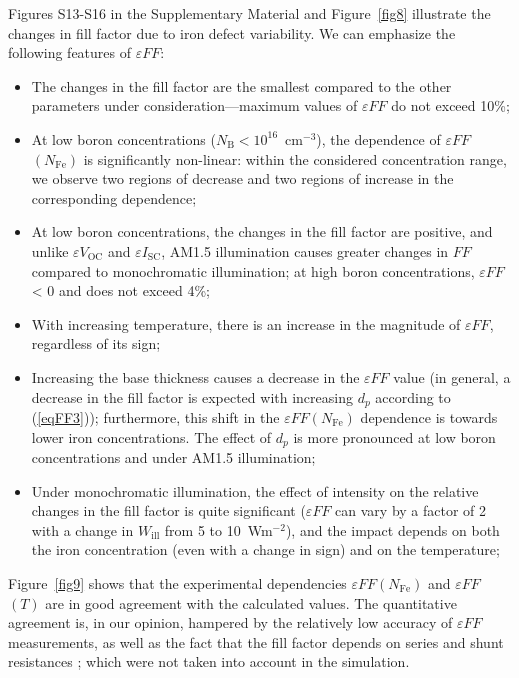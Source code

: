 \documentclass[a4paper,fleqn]{cas-sc}
\begin{document}
Figures S13-S16 in the Supplementary Material and Figure~\ref{fig8} illustrate the changes in fill factor due to iron defect variability. We can emphasize the following features of $\varepsilon FF$:
\begin{itemize}
    \item The changes in the fill factor are the smallest compared to the other parameters under consideration—maximum values of $\varepsilon FF$ do not exceed 10\%;
    \item At low boron concentrations ($N_\mathrm{B}<10^{16}$~cm$^{-3}$), the dependence of $\varepsilon FF$$\left(N_\mathrm{Fe}\right)$ is significantly non-linear: within the considered concentration range, we observe two regions of decrease and two regions of increase in the corresponding dependence;
    \item At low boron concentrations, the changes in the fill factor are positive, and unlike $\varepsilon V_\mathrm{OC}$ and $\varepsilon I_\mathrm{SC}$, AM1.5 illumination causes greater changes in $FF$ compared to monochromatic illumination; at high boron concentrations, $\varepsilon FF$ < 0 and does not exceed 4\%;
    \item With increasing temperature, there is an increase in the magnitude of $\varepsilon FF$, regardless of its sign;
    \item Increasing the base thickness causes a decrease in the $\varepsilon FF$ value (in general, a decrease in the fill factor is expected with increasing $d_p$ according to (\ref{eqFF3})); furthermore, this shift in the $\varepsilon FF$$\left(N_\mathrm{Fe}\right)$ dependence is towards lower iron concentrations. The effect of $d_p$ is more pronounced at low boron concentrations and under AM1.5 illumination;
    \item Under monochromatic illumination, the effect of intensity on the relative changes in the fill factor is quite significant ($\varepsilon FF$ can vary by a factor of 2 with a change in $W_\mathrm{ill}$ from 5 to 10~Wm$^{-2}$), and the impact depends on both the iron concentration (even with a change in sign) and on the temperature;
\end{itemize}

Figure~\ref{fig9} shows that the experimental dependencies $\varepsilon FF$$\left(N_\mathrm{Fe}\right)$ and $\varepsilon FF$$\left(T\right)$ are in good agreement with the calculated values. The quantitative agreement is, in our opinion, hampered  by the relatively low accuracy of $\varepsilon FF$ measurements, as well as the fact that the fill factor depends on series and shunt resistances \cite{Green1981,Green1982}; which were not taken into account in the simulation.
\end{document}
